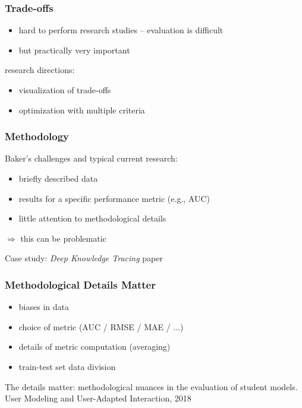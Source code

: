 \documentclass[bigger]{beamer}
\begin{document}
\begin{frame}
  \frametitle{Trade-offs}

  \begin{itemize}
  \item hard to perform research studies -- evaluation is difficult
  \item but practically very important
  \end{itemize}

  research directions:
  \begin{itemize}
  \item visualization of trade-offs
  \item optimization with multiple criteria
  \end{itemize}
\end{frame}

\begin{frame}
  \frametitle{Methodology}

  Baker's challenges and typical current research:
  \begin{itemize}
  \item briefly described data
  \item results for a specific performance metric (e.g., AUC)
  \item little attention to methodological details
  \end{itemize}
  
  \bigskip

  $\Rightarrow$ this can be problematic

  \bigskip
  
  Case study: \emph{Deep Knowledge Tracing} paper
\end{frame}

\begin{frame}
  \frametitle{Methodological Details Matter}

  \begin{itemize}
  \item biases in data
  \item choice of metric (AUC / RMSE / MAE / ...)
  \item details of metric computation (averaging)
  \item train-test set data division
  \end{itemize}

  {\color{gray} \footnotesize The details matter: methodological nuances in the evaluation of student
    models. User Modeling and User-Adapted Interaction, 2018}
\end{frame}
\end{document}
